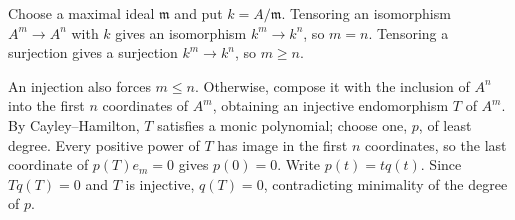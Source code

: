 Choose a maximal ideal $\mathfrak{m}$ and put $k=A/\mathfrak{m}$. Tensoring an isomorphism $A^m\to A^n$ with $k$ gives an isomorphism $k^m\to k^n$, so $m=n$. Tensoring a surjection gives a surjection $k^m\to k^n$, so $m\geq n$.

An injection also forces $m\leq n$. Otherwise, compose it with the inclusion of $A^n$ into the first $n$ coordinates of $A^m$, obtaining an injective endomorphism $T$ of $A^m$. By Cayley–Hamilton, $T$ satisfies a monic polynomial; choose one, $p$, of least degree. Every positive power of $T$ has image in the first $n$ coordinates, so the last coordinate of $p(T)e_m=0$ gives $p(0)=0$. Write $p(t)=tq(t)$. Since $Tq(T)=0$ and $T$ is injective, $q(T)=0$, contradicting minimality of the degree of $p$.
